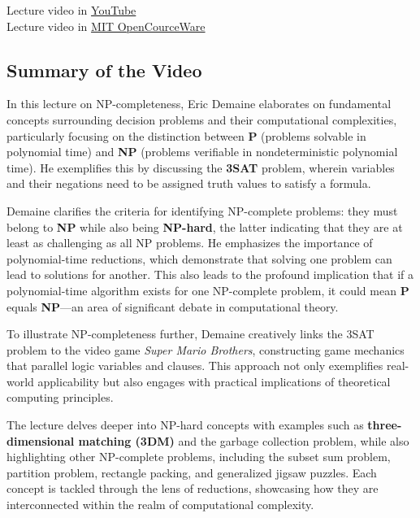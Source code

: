 \documentclass[12pt]{article}
\begin{document}
    Lecture video in  \href{https://www.youtube.com/watch?v=eHZifpgyH_4&t=66s}{YouTube} \\
    Lecture video in  \href{https://ocw.mit.edu/courses/6-046j-design-and-analysis-of-algorithms-spring-2015/resources/lecture-16-complexity-p-np-np-completeness-reductions/}{MIT OpenCourceWare}

    \subsection{Summary of the Video}
    In this lecture on NP-completeness, Eric Demaine elaborates on fundamental concepts surrounding decision problems and their computational complexities, particularly focusing on the distinction between \textbf{P} (problems solvable in polynomial time) and \textbf{NP} (problems verifiable in nondeterministic polynomial time). He exemplifies this by discussing the \textbf{3SAT} problem, wherein variables and their negations need to be assigned truth values to satisfy a formula.

    Demaine clarifies the criteria for identifying NP-complete problems: they must belong to \textbf{NP} while also being \textbf{NP-hard}, the latter indicating that they are at least as challenging as all NP problems. He emphasizes the importance of polynomial-time reductions, which demonstrate that solving one problem can lead to solutions for another. This also leads to the profound implication that if a polynomial-time algorithm exists for one NP-complete problem, it could mean \textbf{P} equals \textbf{NP}—an area of significant debate in computational theory.

    To illustrate NP-completeness further, Demaine creatively links the 3SAT problem to the video game \textit{Super Mario Brothers}, constructing game mechanics that parallel logic variables and clauses. This approach not only exemplifies real-world applicability but also engages with practical implications of theoretical computing principles.

    The lecture delves deeper into NP-hard concepts with examples such as \textbf{three-dimensional matching (3DM)} and the garbage collection problem, while also highlighting other NP-complete problems, including the subset sum problem, partition problem, rectangle packing, and generalized jigsaw puzzles. Each concept is tackled through the lens of reductions, showcasing how they are interconnected within the realm of computational complexity.
\end{document}
